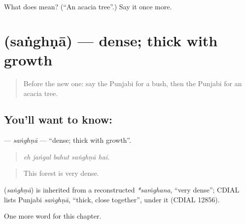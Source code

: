 \begin{tcolorbox}[breakable,colback=teal!4,colframe=teal!35!black,title={Before you move on}]
What does  mean? (\textquotedblleft{}An acacia tree\textquotedblright{}.) Say it once more.
\end{tcolorbox}
\section[\texorpdfstring{\pa{ਸੰਘਣਾ} (saṅghṇā)}{ਸੰਘਣਾ (saṅghṇā)}]{ (saṅghṇā) — dense; thick with growth}

\label{lesson:PA-C298-sanghna}



\begin{quote}
Before the new one: say the Punjabi for a bush, then the Punjabi for an acacia tree.
\end{quote}

\subsection*{You'll want to know: }
\textbf{} — \emph{saṅghṇā} — \textquotedblleft{}dense; thick with growth\textquotedblright{}.

\begin{quote}
    
\end{quote}

\begin{quote}
\emph{eh jaṅgal bahut saṅghṇā hai.}
\end{quote}

\begin{quote}
This forest is very dense.
\end{quote}

\begin{cousinweb}
\textbf{} (\emph{saṅghṇā}) is inherited from a reconstructed \emph{*saṁghana}, \textquotedblleft{}very dense\textquotedblright{}; CDIAL lists Punjabi \emph{saṅghṇā}, \textquotedblleft{}thick, close together\textquotedblright{}, under it (CDIAL 12856).
\end{cousinweb}

\begin{grammarlens}[title={What you've built}]
One more word for this chapter.
\end{grammarlens}

